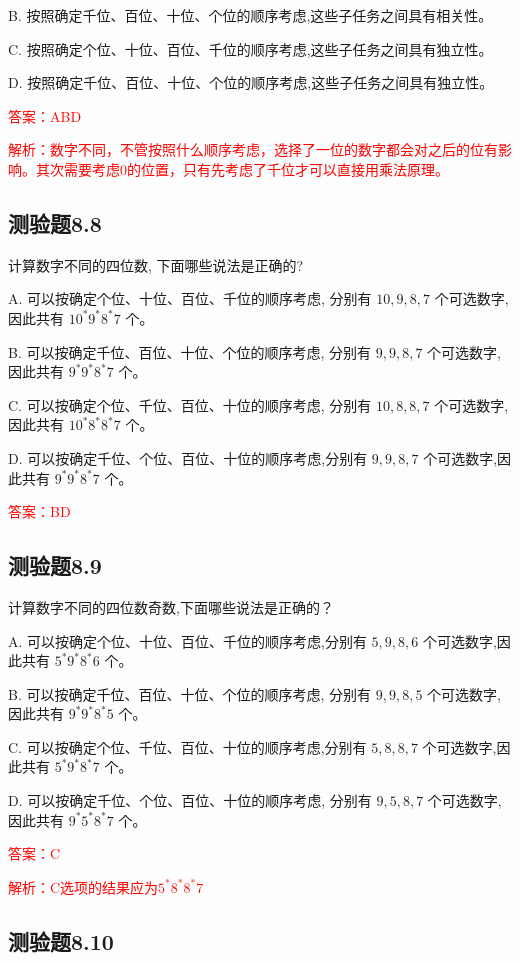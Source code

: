 \documentclass[UTF8, heading=true]{ctexart}
\begin{document}
B. 按照确定千位、百位、十位、个位的顺序考虑,这些子任务之间具有相关性。

C. 按照确定个位、十位、百位、千位的顺序考虑,这些子任务之间具有独立性。

D. 按照确定千位、百位、十位、个位的顺序考虑,这些子任务之间具有独立性。

\textcolor{red}{答案：ABD}

\textcolor{red}{解析：数字不同，不管按照什么顺序考虑，选择了一位的数字都会对之后的位有影响。其次需要考虑0的位置，只有先考虑了千位才可以直接用乘法原理。}


\subsection{测验题8.8}
计算数字不同的四位数, 下面哪些说法是正确的?

A. 可以按确定个位、十位、百位、千位的顺序考虑, 分别有 $10,9,8,7$ 个可选数字, 因此共有 $10^* 9 ^* 8^* 7$ 个。

B. 可以按确定千位、百位、十位、个位的顺序考虑, 分别有 $9,9,8,7$ 个可选数字,因此共有 $9^* 9^* 8^* 7$ 个。

C. 可以按确定个位、千位、百位、十位的顺序考虑, 分别有 $10,8,8,7$ 个可选数字, 因此共有 $10^* 8^* 8^* 7$ 个。

D. 可以按确定千位、个位、百位、十位的顺序考虑,分别有 $9,9,8,7$ 个可选数字,因此共有 $9^* 9^* 8^* 7$ 个。

\textcolor{red}{答案：BD}

\subsection{测验题8.9}

计算数字不同的四位数奇数,下面哪些说法是正确的？

A. 可以按确定个位、十位、百位、千位的顺序考虑,分别有 $5,9,8,6$ 个可选数字,因此共有 $5^* 9^* 8^* 6$ 个。

B. 可以按确定千位、百位、十位、个位的顺序考虑, 分别有 $9,9,8,5$ 个可选数字, 因此共有 $9 ^* 9 ^* 8 ^* 5$ 个。

C. 可以按确定个位、千位、百位、十位的顺序考虑,分别有 $5,8,8,7$ 个可选数字,因此共有 $5 ^* 9 ^* 8 ^* 7$ 个。

D. 可以按确定千位、个位、百位、十位的顺序考虑, 分别有 $9,5,8,7$ 个可选数字, 因此共有 $9 ^* 5^* 8^* 7$ 个。

\textcolor{red}{答案：C}

\textcolor{red}{解析：C选项的结果应为$5^* 8 ^* 8 ^* 7$}

\subsection{测验题8.10}
\end{document}
